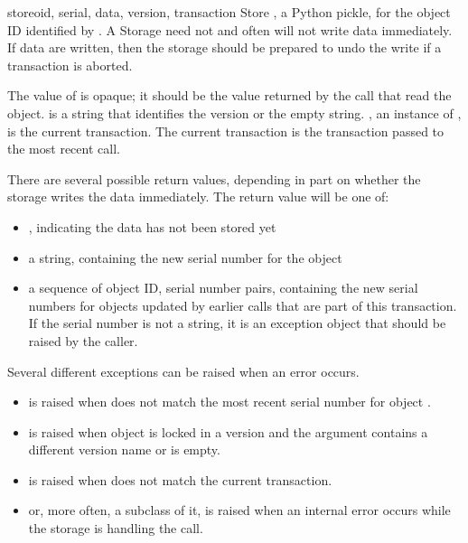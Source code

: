 \documentclass{howto}
\begin{document}
\begin{methoddesc}{store}{oid, serial, data, version, transaction}
  Store , a Python pickle, for the object ID identified by
  .  A Storage need not and often will not write data
  immediately.  If data are written, then the storage should be
  prepared to undo the write if a transaction is aborted.
  
  The value of  is opaque; it should be the value returned
  by the  call that read the object.   is
  a string that identifies the version or the empty string.
  , an instance of
  , is the current transaction.
  The current transaction is the transaction passed to the most recent
   call.
    
  There are several possible return values, depending in part on
  whether the storage writes the data immediately.  The return value
  will be one of:

  \begin{itemize}
        \item {}, indicating the data has not been stored yet
        \item a string, containing the new serial number for the
          object
        \item a sequence of object ID, serial number pairs, containing the
          new serial numbers for objects updated by earlier
           calls that are part of this transaction.
          If the serial number is not a string, it is an exception
          object that should be raised by the caller.
  \end{itemize}
    
  Several different exceptions can be raised when an error occurs.

  \begin{itemize}
        \item {} is raised when 
          does not match the most recent serial number for object
          . 

        \item {} is raised when object
           is locked in a version and the 
          argument contains a different version name or is empty.

        \item {} is raised when
           does not match the current transaction.
   
        \item {} or, more often, a subclass of
          it, is raised when an internal error occurs while the
          storage is handling the  call.
  \end{itemize}
\end{methoddesc}
\end{document}
